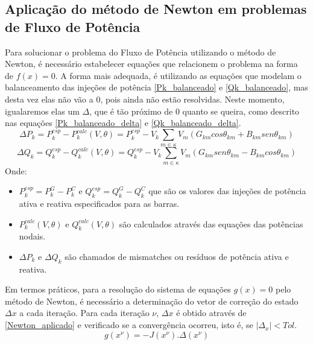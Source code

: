 \subsection{Aplicação do método de Newton em problemas de Fluxo de Potência}
Para solucionar o problema do Fluxo de Potência utilizando o método de Newton, é necessário estabelecer equações que relacionem o problema na forma de $f(x)=0$. A forma mais adequada, é utilizando as equações que modelam o balanceamento das injeções de potência \ref{Pk_balanceado} e \ref{Qk_balanceado}, mas desta vez elas não vão a $0$, pois ainda não estão resolvidas. Neste momento, igualaremos elas um $\Delta$, que é tão próximo de $0$ quanto se queira, como descrito nas equações \ref{Pk_balanceado_delta} e \ref{Qk_balanceado_delta}.\\
\begin{equation}
    \Delta P_k = P^{esp}_k - P^{calc}_k(V,\theta)= P^{esp}_k - V_k \sum_{m\in \kappa} V_m (G_{km} cos\theta_{km} + B_{km}sen\theta_{km})
    \label{Pk_balanceado_delta}
\end{equation}
\begin{equation}
    \Delta Q_k = Q^{esp}_k - Q^{calc}_k(V,\theta) = Q^{esp}_k - V_k \sum_{m\in \kappa} V_m (G_{km} sen\theta_{km} - B_{km}cos\theta_{km})
    \label{Qk_balanceado_delta}
\end{equation}
Onde:
\begin{itemize}
    
    \item $P^{esp}_k = P^G_k -P^C_k$ e $Q^{esp}_k = Q^G_k -Q^C_k$ que são os valores das injeções de potência ativa e reativa especificados para as barras.
    \item $P^{calc}_k(V,\theta)$ e $Q^{calc}_k(V,\theta)$ são calculados através das equações das potências nodais.
    \item $\Delta P_k$ e $\Delta Q_k$ são chamados de mismatches ou resíduos de potência ativa e reativa. 

\end{itemize}
Em termos práticos, para a resolução do sistema de equações $g(x) = 0$ pelo método de Newton, é necessário a determinação do vetor de correção do estado $\Delta x$ a cada iteração. Para cada iteração  $\nu$, $\Delta x$ é obtido através de \ref{Newton_aplicado} e verificado se a convergência ocorreu, isto é, se $|\Delta_x| < Tol$.\\
\begin{equation}
    g(x^\nu) = -J(x^\nu) . \Delta (x^\nu)
    \label{Newton_aplicado}
\end{equation}
